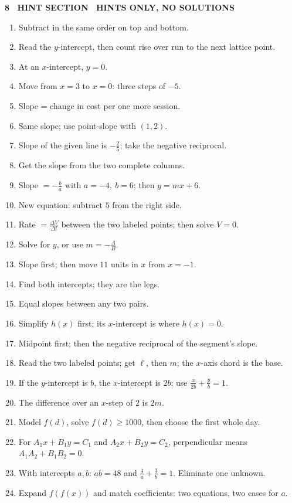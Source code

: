 \documentclass[10pt]{article}
\newcommand{\banner}[1]{\vspace{6pt}\par\noindent\begin{tcolorbox}[enhanced,colback=NAVY,colframe=NAVY,boxrule=0pt,arc=2pt,left=6pt,top=1pt,bottom=1pt,nobeforeafter]\color{white}\bfseries\small\MakeUppercase{#1}\end{tcolorbox}\par\nopagebreak\vspace{2pt}}
\begin{document}
\newpage\banner{8 \textperiodcentered\ Hint Section \textemdash\ hints only, no solutions}
\begin{enumerate}[leftmargin=1.6em,itemsep=1.5pt,label=\textbf{\arabic*.}]
\item Subtract in the same order on top and bottom.
\item Read the $y$-intercept, then count rise over run to the next lattice point.
\item At an $x$-intercept, $y=0$.
\item Move from $x=3$ to $x=0$: three steps of $-5$.
\item Slope = change in cost per one more session.
\item Same slope; use point-slope with $(1,2)$.
\item Slope of the given line is $-\frac25$; take the negative reciprocal.
\item Get the slope from the two complete columns.
\item Slope $=-\frac{b}{a}$ with $a=-4,\ b=6$; then $y=mx+6$.
\item New equation: subtract $5$ from the right side.
\item Rate $=\frac{\Delta V}{\Delta t}$ between the two labeled points; then solve $V=0$.
\item Solve for $y$, or use $m=-\frac AB$.
\item Slope first; then move $11$ units in $x$ from $x=-1$.
\item Find both intercepts; they are the legs.
\item Equal slopes between any two pairs.
\item Simplify $h(x)$ first; its $x$-intercept is where $h(x)=0$.
\item Midpoint first; then the negative reciprocal of the segment's slope.
\item Read the two labeled points; get $\ell$, then $m$; the $x$-axis chord is the base.
\item If the $y$-intercept is $b$, the $x$-intercept is $2b$; use $\frac{x}{2b}+\frac yb=1$.
\item The difference over an $x$-step of $2$ is $2m$.
\item Model $f(d)$, solve $f(d)\ge1000$, then choose the first whole day.
\item For $A_1x+B_1y=C_1$ and $A_2x+B_2y=C_2$, perpendicular means $A_1A_2+B_1B_2=0$.
\item With intercepts $a,b$: $ab=48$ and $\frac4a+\frac3b=1$. Eliminate one unknown.
\item Expand $f(f(x))$ and match coefficients: two equations, two cases for $a$.
\end{enumerate}
\end{document}
